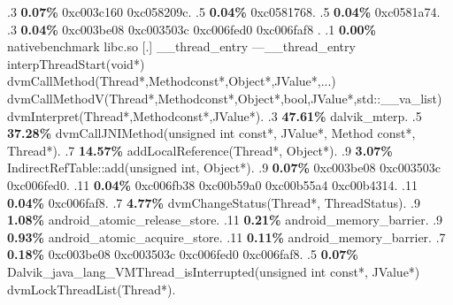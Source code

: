 \begin{profile}
{.3 \textbf{0.07\%} 0xc003c160\newline {} 0xc058209c. 
.5 \textbf{0.04\%} 0xc0581768. 
.5 \textbf{0.04\%} 0xc0581a74. 
.3 \textbf{0.04\%} 0xc003be08\newline {} 0xc003503c\newline {} 0xc006fed0\newline {} 0xc006faf8\newline {} . 
.1 \textbf{ 0.00\%} nativebenchmark  libc.so                [.] \_\_thread\_entry\newline {} ---\_\_thread\_entry\newline {} interpThreadStart(void*)\newline {} dvmCallMethod(Thread*,Methodconst*,Object*,JValue*,...)\newline {} dvmCallMethodV(Thread*,Methodconst*,Object*,bool,JValue*,std::\_\_va\_list)\newline {} dvmInterpret(Thread*,Methodconst*,JValue*). 
.3 \textbf{47.61\%} dalvik\_mterp. 
.5 \textbf{37.28\%} dvmCallJNIMethod(unsigned int const*, JValue*, Method const*, Thread*). 
.7 \textbf{14.57\%} addLocalReference(Thread*, Object*). 
.9 \textbf{3.07\%} IndirectRefTable::add(unsigned int, Object*). 
.9 \textbf{0.07\%} 0xc003be08\newline {} 0xc003503c\newline {} 0xc006fed0. 
.11 \textbf{0.04\%} 0xc006fb38\newline {} 0xc00b59a0\newline {} 0xc00b55a4\newline {} 0xc00b4314. 
.11 \textbf{0.04\%} 0xc006faf8. 
.7 \textbf{4.77\%} dvmChangeStatus(Thread*, ThreadStatus). 
.9 \textbf{1.08\%} android\_atomic\_release\_store. 
.11 \textbf{0.21\%} android\_memory\_barrier. 
.9 \textbf{0.93\%} android\_atomic\_acquire\_store. 
.11 \textbf{0.11\%} android\_memory\_barrier. 
.7 \textbf{0.18\%} 0xc003be08\newline {} 0xc003503c\newline {} 0xc006fed0\newline {} 0xc006faf8. 
.5 \textbf{0.07\%} Dalvik\_java\_lang\_VMThread\_isInterrupted(unsigned int const*, JValue*)\newline {} dvmLockThreadList(Thread*). 
}
\end{profile}
